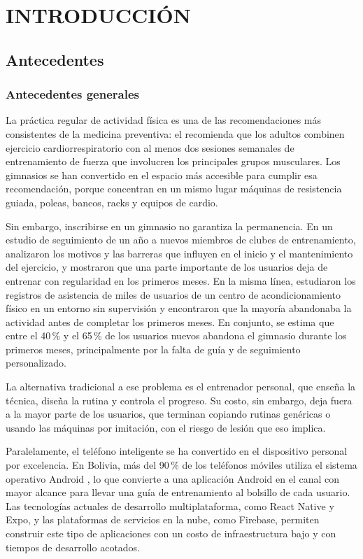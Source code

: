 \chapter{INTRODUCCIÓN}
\label{cap:introduccion}

\section{Antecedentes}
\label{sec:antecedentes}

\subsection{Antecedentes generales}

La práctica regular de actividad física es una de las recomendaciones más
consistentes de la medicina preventiva: el \citet{acsm2021} recomienda que
los adultos combinen ejercicio cardiorrespiratorio con al menos dos sesiones
semanales de entrenamiento de fuerza que involucren los principales grupos
musculares. Los gimnasios se han convertido en el espacio más accesible para
cumplir esa recomendación, porque concentran en un mismo lugar máquinas de
resistencia guiada, poleas, bancos, racks y equipos de cardio.

Sin embargo, inscribirse en un gimnasio no garantiza la permanencia. En un
estudio de seguimiento de un año a nuevos miembros de clubes de
entrenamiento, \citet{gjestvang2020} analizaron los motivos y las barreras
que influyen en el inicio y el mantenimiento del ejercicio, y mostraron que
una parte importante de los usuarios deja de entrenar con regularidad en los
primeros meses. En la misma línea, \citet{sperandei2016} estudiaron los
registros de asistencia de miles de usuarios de un centro de
acondicionamiento físico en un entorno sin supervisión y encontraron que la
mayoría abandonaba la actividad antes de completar los primeros meses. En
conjunto, se estima que entre el 40\,\% y el 65\,\% de los usuarios nuevos
abandona el gimnasio durante los primeros meses, principalmente por la falta
de guía y de seguimiento personalizado.

La alternativa tradicional a ese problema es el entrenador personal, que
enseña la técnica, diseña la rutina y controla el progreso. Su costo, sin
embargo, deja fuera a la mayor parte de los usuarios, que terminan copiando
rutinas genéricas o usando las máquinas por imitación, con el riesgo de
lesión que eso implica.

Paralelamente, el teléfono inteligente se ha convertido en el dispositivo
personal por excelencia. En Bolivia, más del 90\,\% de los teléfonos móviles
utiliza el sistema operativo Android \citep{statcounter2025}, lo que convierte
a una aplicación Android en el canal con mayor alcance para llevar una guía de
entrenamiento al bolsillo de cada usuario. Las tecnologías actuales de
desarrollo multiplataforma, como React Native y Expo, y las plataformas de
servicios en la nube, como Firebase, permiten construir este tipo de
aplicaciones con un costo de infraestructura bajo y con tiempos de desarrollo
acotados.

